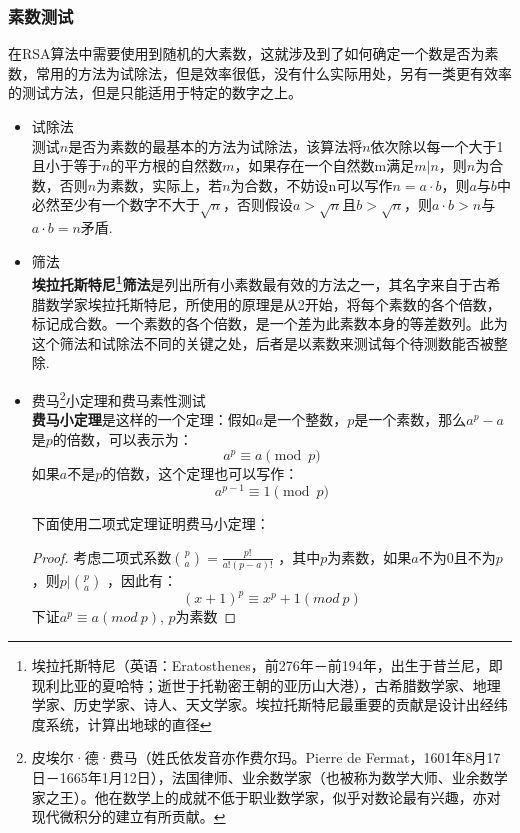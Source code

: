 \documentclass[UTF8]{ctexart}
\begin{document}
\subsubsection{素数测试}

在RSA算法中需要使用到随机的大素数，这就涉及到了如何确定一个数是否为素数，常用的方法为试除法，但是效率很低，没有什么实际用处，另有一类更有效率的测试方法，但是只能适用于特定的数字之上。

\begin{itemize}
	\item
	      试除法\\
	      测试$n$是否为素数的最基本的方法为试除法，该算法将$n$依次除以每一个大于1且小于等于$n$的平方根的自然数$m$，如果存在一个自然数m满足$m|n$，则$n$为合数，否则$n$为素数，实际上，若$n$为合数，不妨设n可以写作$n = a \cdot b$，则$a$与$b$中必然至少有一个数字不大于$\sqrt{n}$，否则假设$a > \sqrt{n}$且$b > \sqrt{n}$，则$a \cdot b > n$与$a \cdot b = n$矛盾. %

	\item
	      筛法\\
	      \textbf{埃拉托斯特尼\footnote{埃拉托斯特尼（英语：Eratosthenes，前276年－前194年，出生于昔兰尼，即现利比亚的夏哈特；逝世于托勒密王朝的亚历山大港），古希腊数学家、地理学家、历史学家、诗人、天文学家。埃拉托斯特尼最重要的贡献是设计出经纬度系统，计算出地球的直径}筛法}是列出所有小素数最有效的方法之一，其名字来自于古希腊数学家埃拉托斯特尼，所使用的原理是从2开始，将每个素数的各个倍数，标记成合数。一个素数的各个倍数，是一个差为此素数本身的等差数列。此为这个筛法和试除法不同的关键之处，后者是以素数来测试每个待测数能否被整除.

	\item
	      费马\footnote{皮埃尔·德·费马（姓氏依发音亦作费尔玛。Pierre de Fermat，1601年8月17日－1665年1月12日），法国律师、业余数学家（也被称为数学大师、业余数学家之王）。他在数学上的成就不低于职业数学家，似乎对数论最有兴趣，亦对现代微积分的建立有所贡献。}小定理和费马素性测试\\
	      \textbf{费马小定理}是这样的一个定理：假如$a$是一个整数，$p$是一个素数，那么$a^p-a$是$p$的倍数，可以表示为：
	      \[
		      a^p \equiv a \pmod{p}
	      \]
	      如果$a$不是$p$的倍数，这个定理也可以写作：
	      \[
		      a^{p-1} \equiv 1 \pmod{p}
	      \]

	      下面使用二项式定理证明费马小定理：
	      \begin{proof}
		      考虑二项式系数$\binom{p}{a} = \frac{p!}{a!(p-a)!}$ ，其中$p$为素数，如果$a$不为0且不为$p$，则$p | \binom{p}{a}$ ，因此有：
		      \begin{equation}
			      (x+1)^p \equiv x^p + 1 (mod \ p) \label{binom_lemma}
		      \end{equation}
		      下证$a^p \equiv a(mod \ p)$, $p$为素数


\end{proof}
\end{itemize}
\end{document}
